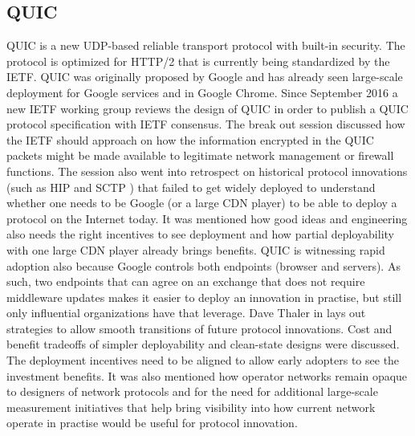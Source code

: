 \subsection{QUIC}

QUIC \cite{draft-ietf-quic-transport} is a new UDP-based reliable transport
protocol with built-in security. The protocol is optimized for HTTP/2
\cite{rfc7540} that is currently being standardized by the \ac{IETF}. QUIC was
originally proposed by Google and has already seen large-scale deployment for
Google services and in Google Chrome. Since September 2016 a new IETF working
group reviews the design of QUIC in order to publish a QUIC protocol
specification with \ac{IETF} consensus. The break out session discussed how
the \ac{IETF} should approach on how the information encrypted in the QUIC
packets might be made available to legitimate network management or firewall
functions. The session also went into retrospect on historical protocol
innovations (such as HIP \cite{pnikander:comst:2010} and SCTP \cite{rfc4960})
that failed to get widely deployed to understand whether one needs to be
Google (or a large CDN player) to be able to deploy a protocol on the Internet
today. It was mentioned how good ideas and engineering also needs the right
incentives to see deployment and how partial deployability with one large CDN
player already brings benefits. QUIC is witnessing rapid adoption also because
Google controls both endpoints (browser and servers). As such, two endpoints
that can agree on an exchange that does not require middleware updates makes
it easier to deploy an innovation in practise, but still only influential
organizations have that leverage. Dave Thaler in
\cite{draft-iab-protocol-transitions} lays out strategies to allow smooth
transitions of future protocol innovations. Cost and benefit tradeoffs of
simpler deployability and clean-state designs were discussed. The deployment
incentives need to be aligned to allow early adopters to see the investment
benefits. It was also mentioned how operator networks remain opaque to
designers of network protocols and for the need for additional large-scale
measurement initiatives that help bring visibility into how current network
operate in practise would be useful for protocol innovation.




